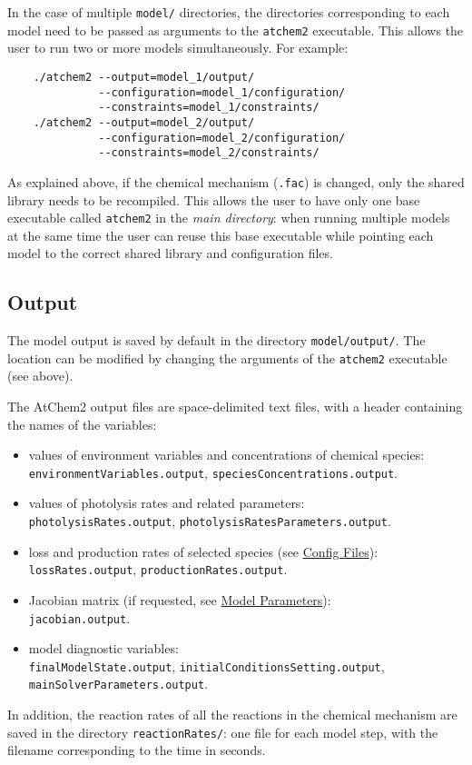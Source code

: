 In the case of multiple \texttt{model/} directories, the directories
corresponding to each model need to be passed as arguments to the
\texttt{atchem2} executable. This allows the user to run two or more
models simultaneously. For example:

\begin{verbatim}
    ./atchem2 --output=model_1/output/
              --configuration=model_1/configuration/
              --constraints=model_1/constraints/
    ./atchem2 --output=model_2/output/
              --configuration=model_2/configuration/
              --constraints=model_2/constraints/
\end{verbatim}

As explained above, if the chemical mechanism (\texttt{.fac}) is
changed, only the shared library needs to be recompiled. This allows
the user to have only one base executable called \texttt{atchem2} in
the \emph{main directory}: when running multiple models at the same
time the user can reuse this base executable while pointing each model
to the correct shared library and configuration files.

\subsection{Output} \label{subsec:output}

The model output is saved by default in the directory
\texttt{model/output/}. The location can be modified by changing the
arguments of the \texttt{atchem2} executable (see above).

The AtChem2 output files are space-delimited text files, with a header
containing the names of the variables:

\begin{itemize}
\item values of environment variables and concentrations of chemical
  species:\\ \texttt{environmentVariables.output},
  \texttt{speciesConcentrations.output}.
\item values of photolysis rates and related parameters:\\
  \texttt{photolysisRates.output},
  \texttt{photolysisRatesParameters.output}.
\item loss and production rates of selected species (see
  \hyperref[sec:config]{Config Files}):\\ \texttt{lossRates.output},
  \texttt{productionRates.output}.
\item Jacobian matrix (if requested, see
  \hyperref[sec:parameters]{Model Parameters}):\\
  \texttt{jacobian.output}.
\item model diagnostic variables:\\ \texttt{finalModelState.output},
  \texttt{initialConditionsSetting.output},
  \texttt{mainSolverParameters.output}.
\end{itemize}

In addition, the reaction rates of all the reactions in the chemical
mechanism are saved in the directory \texttt{reactionRates/}: one file
for each model step, with the filename corresponding to the time in
seconds.
